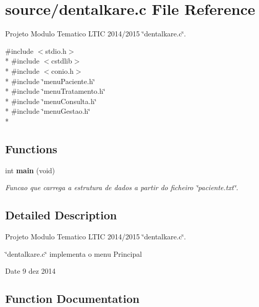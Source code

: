 \section{source/dentalkare.c File Reference}
\label{dentalkare_8c}


Projeto Modulo Tematico L\+T\+I\+C 2014/2015 \char`\"{}dentalkare.\+c\char`\"{}.  


{\ttfamily \#include $<$stdio.\+h$>$}\\*
{\ttfamily \#include $<$cstdlib$>$}\\*
{\ttfamily \#include $<$conio.\+h$>$}\\*
{\ttfamily \#include \char`\"{}menu\+Paciente.\+h\char`\"{}}\\*
{\ttfamily \#include \char`\"{}menu\+Tratamento.\+h\char`\"{}}\\*
{\ttfamily \#include \char`\"{}menu\+Consulta.\+h\char`\"{}}\\*
{\ttfamily \#include \char`\"{}menu\+Gestao.\+h\char`\"{}}\\*
\subsection*{Functions}
\begin{DoxyCompactItemize}
\item 
int {\bf main} (void)
\begin{DoxyCompactList}\small\item\em Funcao que carrega a estrutura de dados a partir do ficheiro \char`\"{}paciente.\+txt\char`\"{}. \end{DoxyCompactList}\end{DoxyCompactItemize}


\subsection{Detailed Description}
Projeto Modulo Tematico L\+T\+I\+C 2014/2015 \char`\"{}dentalkare.\+c\char`\"{}. 

\char`\"{}dentalkare.\+c\char`\"{} implementa o menu Principal \begin{DoxyDate}{Date}
9 dez 2014 
\end{DoxyDate}


\subsection{Function Documentation}
